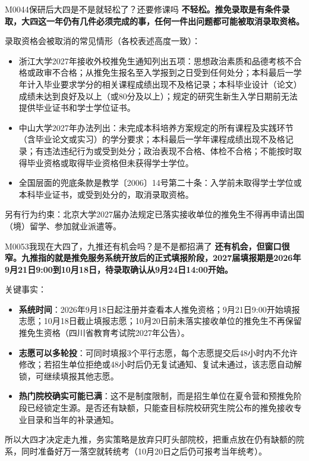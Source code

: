 \begin{qa}{M0044}{保研后大四是不是就轻松了？还要修课吗}
\textbf{不轻松。推免录取是有条件录取，大四这一年仍有几件必须完成的事，任何一件出问题都可能被取消录取资格。}

录取资格会被取消的常见情形（各校表述高度一致）：

\begin{itemize}
  \item 浙江大学2027年接收外校推免生通知列出五项：思想政治素质和品德考核不合格或政审不合格；从推免生报名至入学报到之日受到任何处分；本科最后一学年计入毕业要求学分的相关课程成绩出现不及格记录；本科毕业设计（论文）成绩未达到良好及以上（或80分及以上）；规定的研究生新生入学日期前无法提供毕业证书和学士学位证书。
  \item 中山大学2027年办法列出：未完成本科培养方案规定的所有课程及实践环节（含毕业论文或实习）的学分要求；本科最后一学年课程成绩出现不及格记录；有违法违纪行为或受到处分；政治表现不合格、体检不合格；不能按时取得毕业资格或取得毕业资格但未获得学士学位。
  \item 全国层面的兜底条款是教学〔2006〕14号第二十条：入学前未取得学士学位或本科毕业证书，或受到处分的，取消录取资格。
\end{itemize}

另有行为约束：北京大学2027届办法规定已落实接收单位的推免生不得再申请出国（境）留学、参加就业派遣等。
\end{qa}

\begin{qa}{M0053}{我现在大四了，九推还有机会吗？是不是都招满了}
\textbf{还有机会，但窗口很窄。九推指的就是推免服务系统开放后的正式填报阶段，2027届填报期是2026年9月21日9:00到10月18日，待录取确认从9月24日14:00开始。}

关键事实：

\begin{itemize}
  \item \textbf{系统时间}：2026年9月18日起注册并查看本人推免资格；9月21日9:00开始填报志愿；10月18日截止填报志愿；10月20日前未落实接收单位的推免生不再保留推免生资格（四川省教育考试院2027年公告）。
  \item \textbf{志愿可以多轮投}：可同时填报3个平行志愿，每个志愿提交后48小时内不允许修改；若招生单位拒绝或48小时后仍无复试通知、复试未通过，该志愿自动解锁，可继续填报其他志愿。
  \item \textbf{热门院校确实可能已满}：这不是制度限制，而是招生单位在夏令营和预推免阶段已经锁定生源。是否还有缺额，只能查目标院校研究生院公布的推免接收专业目录和当年的补录通知。
\end{itemize}

所以大四才决定走九推，务实策略是放弃只盯头部院校，把重点放在仍有缺额的院系，同时准备好万一落空就转统考（10月20日之后仍可报考当年统考）。
\end{qa}

